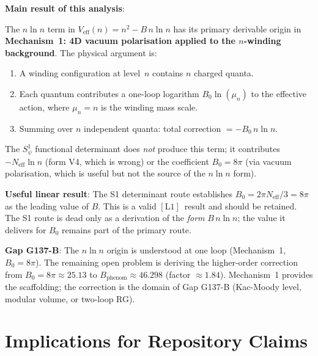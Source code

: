 \documentclass[12pt,a4paper]{article}
\theoremstyle{definition}
\theoremstyle{remark}
\newcommand{\Neff}{N_{\mathrm{eff}}}
\newcommand{\Lone}{$[\mathrm{L1}]$}
\begin{document}
\begin{resultbox}
\textbf{Main result of this analysis}:

The $n\ln n$ term in $V_\mathrm{eff}(n) = n^2 - B\,n\ln n$ has its primary
derivable origin in \textbf{Mechanism~1: 4D vacuum polarisation applied to the
$n$-winding background}.  The physical argument is:
\begin{enumerate}
  \item A winding configuration at level~$n$ contains $n$ charged quanta.
  \item Each quantum contributes a one-loop logarithm $B_0\ln(\mu_n)$ to the
        effective action, where $\mu_n = n$ is the winding mass scale.
  \item Summing over $n$ independent quanta: total correction $= -B_0\,n\ln n$.
\end{enumerate}

The $S^1_\psi$ functional determinant does \emph{not} produce this term;
it contributes $-\Neff\ln n$ (form V4, which is wrong) or the coefficient
$B_0 = 8\pi$ (via vacuum polarisation, which is useful but not the source
of the $n\ln n$ form).

\medskip
\textbf{Useful linear result}: The S1 determinant route establishes
$B_0 = 2\pi\Neff/3 = 8\pi$ as the leading value of $B$.  This is a valid
\Lone\ result and should be retained.  The S1 route is dead only as a
derivation of the \emph{form} $B\,n\ln n$; the value it delivers for $B_0$
remains part of the primary route.

\medskip
\textbf{Gap G137-B}: The $n\ln n$ origin is understood at one loop (Mechanism~1,
$B_0 = 8\pi$).  The remaining open problem is deriving the higher-order
correction from $B_0 = 8\pi \approx 25.13$ to $B_\mathrm{phenom} \approx 46.298$
(factor $\approx 1.84$).  Mechanism~1 provides the scaffolding; the correction
is the domain of Gap G137-B (Kac-Moody level, modular volume, or two-loop RG).
\end{resultbox}

\section{Implications for Repository Claims}
\label{sec:nlogn:implications}
\end{document}
